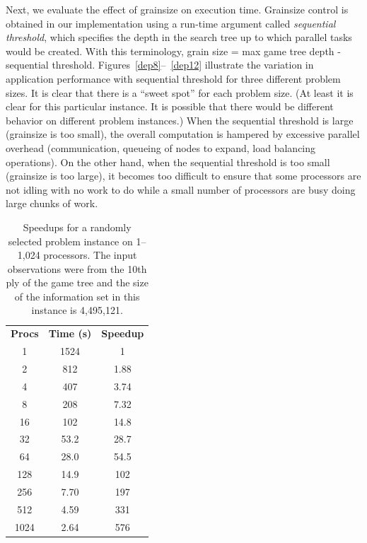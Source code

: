 \documentclass[10pt, conference, compsocconf]{IEEEtran}
\begin{document}
Next, we evaluate the effect of grainsize on execution time. 
Grainsize control is obtained in our implementation using a run-time argument called \emph{sequential threshold}, which specifies the depth in the search tree up to which parallel tasks would be created. With this terminology, grain size = max game tree depth - sequential threshold. Figures~\ref{dep8}--~\ref{dep12} illustrate the variation in application performance with sequential threshold for three different problem sizes.  It is clear that there is a ``sweet
spot'' for each problem size.  (At least it is clear for this particular
instance.  It is possible that there would be different behavior on different
problem instances.)  When the sequential threshold is large (grainsize is too small), the overall computation
is hampered by excessive parallel overhead (communication, queueing of nodes to
expand, load balancing operations).  On the other hand, when the sequential threshold is too small (grainsize is
too large), it becomes too difficult to ensure that some processors are not
idling with no work to do while a small number of processors are busy doing
large chunks of work.  


\begin{table}[t]

\caption{Speedups for a randomly selected problem instance on 1--1,024
processors.  The input observations were from the 10th ply of the game tree and
the size of the information set in this instance is 4,495,121.}
\centering
\begin{tabular}{ccc}
{\bf Procs}	&	{\bf Time (s)} 	&	{\bf Speedup}\\
1	&	1524	&	1\\
2	&	812	&	1.88\\
4	&	407	&	3.74\\
8	&	208	&	7.32\\
16	&	102	&	14.8\\
32	&	53.2	&	28.7\\
64	&	28.0	&	54.5\\
128	&	14.9	&	102\\
256	&	7.70	&	197\\
512	&	4.59	&	331\\
1024	&	2.64	&	576\\
\end{tabular}


\label{speedups}
\end{table}
\end{document}
